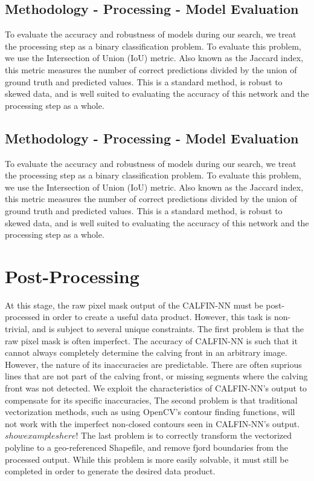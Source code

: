 \documentclass[tc, manuscript]{copernicus}
\begin{document}
\subsection{Methodology - Processing - Model Evaluation}
To evaluate the accuracy and robustness of models during our search, we treat the processing step as a binary classification problem. To evaluate this problem, we use the Intersection of Union (IoU) metric. Also known as the Jaccard index, this metric measures the number of correct predictions divided by the union of ground truth and predicted values. This is a standard method, is robust to skewed data, and is well suited to evaluating the accuracy of this network and the processing step as a whole.

\subsection{Methodology - Processing - Model Evaluation}
To evaluate the accuracy and robustness of models during our search, we treat the processing step as a binary classification problem. To evaluate this problem, we use the Intersection of Union (IoU) metric. Also known as the Jaccard index, this metric measures the number of correct predictions divided by the union of ground truth and predicted values. This is a standard method, is robust to skewed data, and is well suited to evaluating the accuracy of this network and the processing step as a whole.


\section{Post-Processing}
At this stage, the raw pixel mask output of the CALFIN-NN must be post-processed in order to create a useful data product. However, this task is non-trivial, and is subject to several unique constraints.
The first problem is that the raw pixel mask is often imperfect. The accuracy of CALFIN-NN is such that it cannot always completely determine the calving front in an arbitrary image. However, the nature of its inaccuracies are predictable. There are often suprious lines that are not part of the calving front, or missing segments where the calving front was not detected. We exploit the characteristics of CALFIN-NN's output to compensate for its specific inaccuracies,
The second problem is that traditional vectorization methods, such as using OpenCV's contour finding functions, will not work with the imperfect non-closed contours seen in  CALFIN-NN's output. $show examples here!$
The last problem is to correctly transform the vectorized polyline to a geo-referenced Shapefile, and remove fjord boundaries from the processed output. While this problem is more easily solvable, it must still be completed in order to generate the desired data product.
\end{document}
